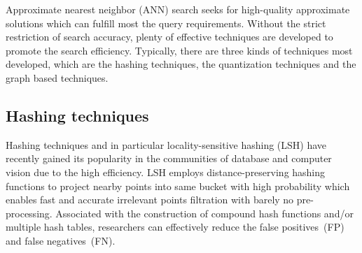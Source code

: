 \documentclass[twocolumn]{svjour3}          %
\begin{document}
Approximate nearest neighbor (ANN) search seeks for high-quality approximate solutions which can fulfill most the query requirements. Without the strict restriction of search accuracy, plenty of effective techniques are developed to promote the search efficiency. Typically, there are three kinds of techniques most developed, which are the hashing techniques, the quantization techniques and the graph based techniques.


\subsection{Hashing techniques}
Hashing techniques and in particular locality-sensitive hashing (LSH) have recently gained its popularity in the communities of database and computer vision due to the high efficiency. LSH employs distance-preserving hashing functions to project nearby points into same bucket with high probability which enables fast and accurate irrelevant points filtration with barely no pre-processing. Associated with the construction of compound hash functions and/or multiple hash tables, researchers can effectively reduce the false positives~(FP) and false negatives~(FN).
\end{document}
